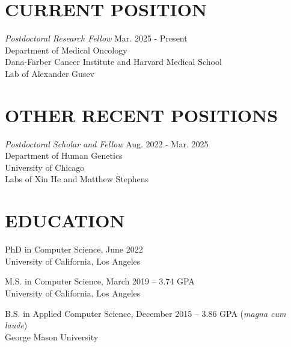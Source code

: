 \documentclass[margin, 10pt]{res} %
\begin{document}
\begin{resume}


\section{CURRENT POSITION}

{\sl Postdoctoral Research Fellow} \hfill Mar. 2025 - Present \\ Department of Medical Oncology \\ Dana-Farber Cancer Institute and Harvard Medical School \\ Lab of Alexander Gusev \\


\section{OTHER RECENT POSITIONS}

{\sl Postdoctoral Scholar and Fellow} \hfill Aug. 2022 - Mar. 2025 \\ Department of Human Genetics \\ University of Chicago \\ Labs of Xin He and Matthew Stephens




\section{EDUCATION}

PhD in Computer Science, June 2022 \\
University of California, Los Angeles

M.S. in Computer Science, March 2019 -- 3.74 GPA \\
University of California, Los Angeles

B.S. in Applied Computer Science, December 2015 -- 3.86 GPA ({\sl magna cum laude}) \\
George Mason University
  


\end{resume}
\end{document}
